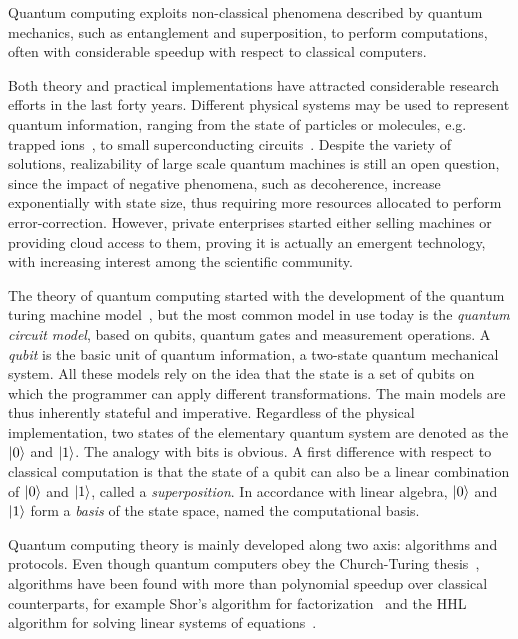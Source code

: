 Quantum computing exploits non-classical phenomena described by quantum
mechanics, such as entanglement and superposition, to perform computations,
 often with considerable speedup with respect to classical computers.

Both theory and practical implementations have attracted considerable research
efforts in the last forty years. Different physical systems may be used to represent
quantum information, ranging from the state of
particles or molecules, e.g. trapped ions~\cite{pogorelov_compact_2021}, to
small superconducting circuits~\cite{clarke_superconducting_2008}. Despite the
variety of solutions, realizability of large scale quantum machines is still an
open question, since the impact of negative phenomena, such as decoherence,
increase exponentially with state size, thus requiring more resources allocated to
perform error-correction. However, private enterprises started
either selling machines or providing cloud access to them, proving it is actually 
an emergent technology, with increasing interest among the scientific community.

The theory of quantum computing started with the development of the quantum
turing machine model~\cite{benioff_quantum_1982}, but the most common model in use today is the\textit{ quantum circuit model}, based on qubits, quantum gates and
measurement operations. A \textit{qubit} is the basic unit of quantum information, a two-state quantum mechanical system. All these models rely on the idea that the state is a set of qubits on which the programmer can apply different transformations. The main models are thus inherently stateful and imperative. 
Regardless of the physical implementation, two states of the elementary quantum system are denoted as the $\ket{0}$ and $\ket{1}$.
The analogy with bits is obvious. A first difference with respect to classical computation is that the state of a qubit can also be a linear combination of $\ket{0}$ and $\ket{1}$, called a \textit{superposition}. In accordance with linear algebra, $\ket{0}$ and $\ket{1}$ form a \textit{basis} of the state space, named the computational basis. 

Quantum computing theory is mainly developed along two axis: algorithms and
protocols. Even though quantum computers obey the Church-Turing
thesis~\cite{nielsen_quantum_2010}, algorithms have been found with more
than polynomial speedup over classical counterparts, for example Shor's algorithm for
factorization~\cite{shor_algorithms_1994} and the HHL algorithm for solving
linear systems of equations~\cite{harrow_quantum_2009}.

